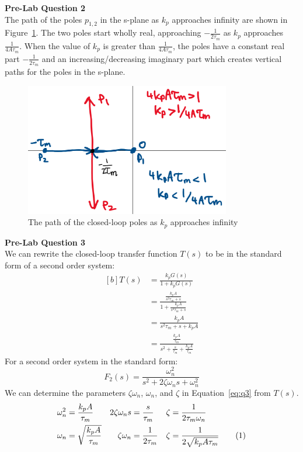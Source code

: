 \documentclass[12pt]{article}
\begin{document}
\textbf{Pre-Lab Question 2} \\
The path of the poles $p_{1,2}$ in the s-plane as $k_p$ approaches infinity are shown in Figure~\ref{fig:q2}. The two poles start wholly real, approaching $-\frac{1}{2\tau_m}$ as $k_p$ approaches $\frac{1}{4A\tau_m}$. When the value of $k_p$ is greater than $\frac{1}{4A\tau_m}$, the poles have a constant real part $-\frac{1}{2\tau_m}$ and an increasing/decreasing imaginary part which creates vertical paths for the poles in the s-plane.
\begin{figure}[h!]
    \centering
    \includegraphics[width=0.8\textwidth]{q2}
    \caption{\label{fig:q2}The path of the closed-loop poles as $k_p$ approaches infinity}
\end{figure} \newpage

\textbf{Pre-Lab Question 3} \\
We can rewrite the closed-loop transfer function $T(s)$ to be in the standard form of a second order system:
\begin{equation*}
\begin{aligned}[b]
    T(s) &= \frac{k_pG(s)}{1 + k_pG(s)} \\
    &= \frac{\frac{k_pA}{s^2\tau_m + s}}{1 + \frac{k_pA}{s^2\tau_m + s}} \\
    &= \frac{k_pA}{s^2\tau_m + s + k_pA} \\
    &= \frac{\frac{k_pA}{\tau_m}}{s^2 + \frac{s}{\tau_m} + \frac{k_pA}{\tau_m}}
\end{aligned}
\end{equation*}
For a second order system in the standard form:
\begin{equation*}
    F_2(s) = \frac{\omega_n^2}{s^2 + 2\zeta\omega_ns + \omega_n^2}
\end{equation*}
We can determine the parameters $\zeta\omega_n$, $\omega_n$, and $\zeta$ in Equation~\ref{eq:q3} from $T(s)$.
\begin{align*}
    \omega_n^2 &= \frac{k_pA}{\tau_m} & 2\zeta\omega_ns &= \frac{s}{\tau_m} & \zeta &= \frac{1}{2\tau_m\omega_n} \\
    \omega_n &= \sqrt{\frac{k_pA}{\tau_m}} & \zeta\omega_n &= \frac{1}{2\tau_m} & \zeta &= \frac{1}{2\sqrt{k_pA\tau_m}} \stepcounter{equation}\tag{\theequation}\label{eq:q3}
\end{align*}
\end{document}
